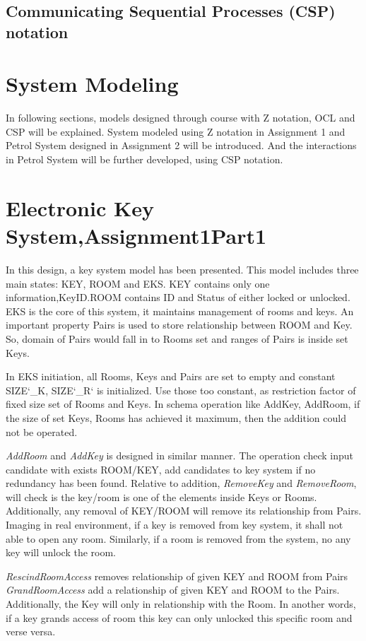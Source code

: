 \subsection{Communicating Sequential Processes (CSP) notation}
\section{System Modeling}
In following sections, models designed through course with Z notation, OCL and CSP will be explained. System modeled using Z notation in Assignment 1 and Petrol System designed in Assignment 2 will be introduced. And the interactions in Petrol System will be further developed, using CSP notation.
\section{Electronic Key System,Assignment1Part1}
In this design, a key system model has been presented. This model includes three main states: KEY, ROOM and EKS. KEY contains only one information,KeyID.ROOM contains ID and Status of either locked or unlocked. EKS is the core of this system, it maintains management of rooms and keys. An important property Pairs is used to store relationship between ROOM and Key. So, domain of Pairs would fall in to Rooms set and ranges of Pairs is inside set Keys. 

In EKS initiation, all Rooms, Keys and Pairs are set to empty and constant SIZE\char`_K, SIZE\char`_R` is initialized. Use those too constant, as restriction factor of fixed size set of Rooms and Keys. In schema operation like AddKey, AddRoom, if the size of set Keys, Rooms has achieved it maximum, then the addition could not be operated. 

\textit{AddRoom} and \textit{AddKey} is designed in similar manner. The operation check input candidate with exists ROOM/KEY, add candidates to key system if no redundancy has been found. 
Relative to addition, \textit{RemoveKey} and \textit{RemoveRoom}, will check is the key/room is one of the elements inside Keys or Rooms. Additionally, any removal of KEY/ROOM will remove its relationship from Pairs. Imaging in real environment, if a key is removed from key system, it shall not able to open any room. Similarly, if a room is removed from the system, no any key will unlock the room. 

\textit{RescindRoomAccess} removes relationship of given KEY and ROOM from Pairs
\textit{GrandRoomAccess} add a relationship of given KEY and ROOM to the Pairs. Additionally, the Key will only in relationship with the Room. In another words, if a key grands access of room this key can only unlocked this specific room and verse versa. 

